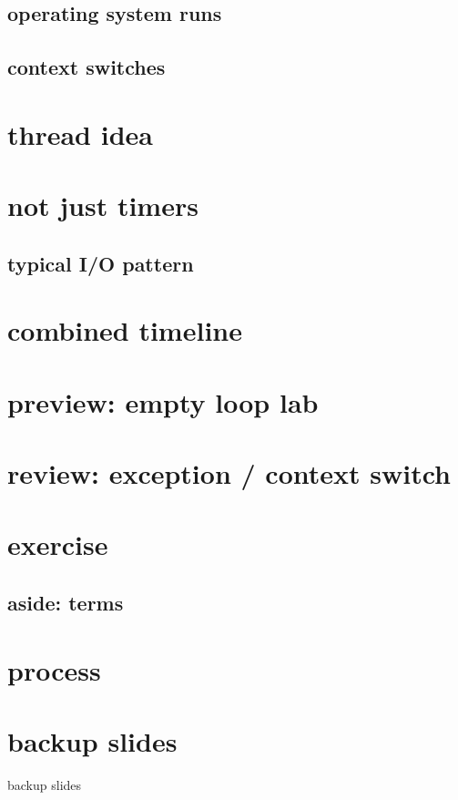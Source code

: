 \subsection{operating system runs}


\subsection{context switches} 


\section{thread idea}


\section{not just timers}

\subsection{typical I/O pattern}




\section{combined timeline}


\section{preview: empty loop lab}


\section{review: exception / context switch}


\section{exercise}


\subsection{aside: terms}


\section{process}




\section{backup slides}
\begin{frame}{backup slides}
\end{frame}


